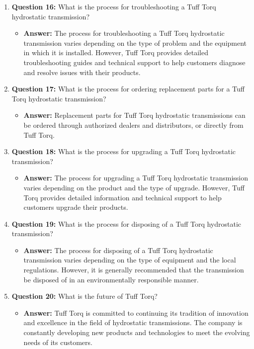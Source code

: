 \documentclass{article}
\begin{document}
\begin{enumerate}
    \item \textbf{Question 16:} What is the process for troubleshooting a Tuff Torq hydrostatic transmission?
    \begin{itemize}
        \item \textbf{Answer:} The process for troubleshooting a Tuff Torq hydrostatic transmission varies depending on the type of problem and the equipment in which it is installed. However, Tuff Torq provides detailed troubleshooting guides and technical support to help customers diagnose and resolve issues with their products.
    \end{itemize}
    
    \item \textbf{Question 17:} What is the process for ordering replacement parts for a Tuff Torq hydrostatic transmission?
    \begin{itemize}
        \item \textbf{Answer:} Replacement parts for Tuff Torq hydrostatic transmissions can be ordered through authorized dealers and distributors, or directly from Tuff Torq.
    \end{itemize}
    
    \item \textbf{Question 18:} What is the process for upgrading a Tuff Torq hydrostatic transmission?
    \begin{itemize}
        \item \textbf{Answer:} The process for upgrading a Tuff Torq hydrostatic transmission varies depending on the product and the type of upgrade. However, Tuff Torq provides detailed information and technical support to help customers upgrade their products.
    \end{itemize}
    
    \item \textbf{Question 19:} What is the process for disposing of a Tuff Torq hydrostatic transmission?
    \begin{itemize}
        \item \textbf{Answer:} The process for disposing of a Tuff Torq hydrostatic transmission varies depending on the type of equipment and the local regulations. However, it is generally recommended that the transmission be disposed of in an environmentally responsible manner.
    \end{itemize}
    
    \item \textbf{Question 20:} What is the future of Tuff Torq?
    \begin{itemize}
        \item \textbf{Answer:} Tuff Torq is committed to continuing its tradition of innovation and excellence in the field of hydrostatic transmissions. The company is constantly developing new products and technologies to meet the evolving needs of its customers.
    \end{itemize}
\end{enumerate}
\end{document}
